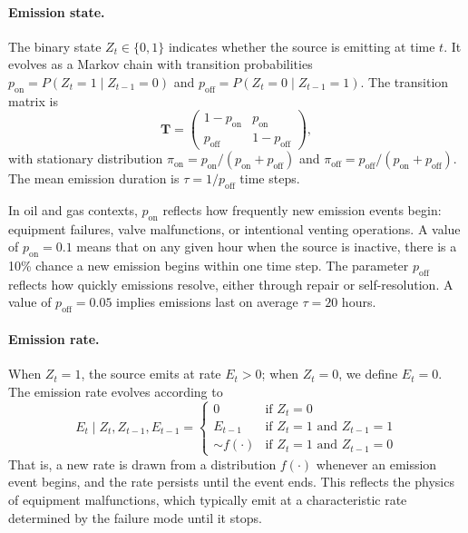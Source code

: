 \documentclass[11pt]{article}
\newcommand{\edit}[1]{{\color{magenta}#1}}
\begin{document}
\paragraph{Emission state.} The binary state $Z_t \in \{0,1\}$ indicates whether the source is emitting at time $t$. It evolves as a Markov chain with transition probabilities $p_{\text{on}} = P(Z_t = 1 \mid Z_{t-1} = 0)$ and $p_{\text{off}} = P(Z_t = 0 \mid Z_{t-1} = 1)$. The transition matrix is
\begin{equation}
    \mathbf{T} = \begin{pmatrix} 1 - p_{\text{on}} & p_{\text{on}} \\ p_{\text{off}} & 1 - p_{\text{off}} \end{pmatrix},
\end{equation}
with stationary distribution $\pi_{\text{on}} = p_{\text{on}}/(p_{\text{on}} + p_{\text{off}})$ and $\pi_{\text{off}} = p_{\text{off}}/(p_{\text{on}} + p_{\text{off}})$. The mean emission duration is $\tau = 1/p_{\text{off}}$ time steps.

In oil and gas contexts, $p_{\text{on}}$ reflects how frequently new emission events begin: equipment failures, valve malfunctions, or intentional venting operations. A value of $p_{\text{on}} = 0.1$ means that on any given \edit{hour} when the source is inactive, there is a 10\% chance a new emission begins within one time step. The parameter $p_{\text{off}}$ reflects how quickly emissions resolve, either through repair or self-resolution. A value of $p_{\text{off}} = 0.05$ implies emissions last on average $\tau = 20$ hours.

\paragraph{Emission rate.} When $Z_t = 1$, the source emits at rate $E_t > 0$; when $Z_t = 0$, we define $E_t = 0$. The emission rate evolves according to
\begin{equation}
    E_t \mid Z_t, Z_{t-1}, E_{t-1} = 
    \begin{cases}
        0 & \text{if } Z_t = 0 \\
        E_{t-1} & \text{if } Z_t = 1 \text{ and } Z_{t-1} = 1 \\
        \sim f(\cdot) & \text{if } Z_t = 1 \text{ and } Z_{t-1} = 0
    \end{cases}
\end{equation}
That is, a new rate is drawn from a distribution $f(\cdot)$ whenever an emission event begins, and the rate persists until the event ends. This reflects the physics of equipment malfunctions, which typically emit at a characteristic rate determined by the failure mode until it stops.
\end{document}
